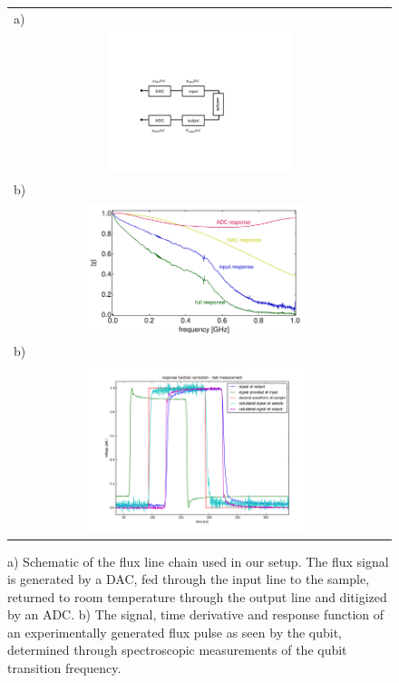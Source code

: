 \begin{figure}
	\begin{tabular}{c}
	 \multicolumn{1}{l}{a)} \\ \includegraphics[width=0.5\textwidth]{"./material/figures/measurement/fluxline_model"} \\
	 \multicolumn{1}{l}{b)} \\ \includegraphics[width=0.6\textwidth]{"./material_thesis/fluxline response/response"} \\
	 \multicolumn{1}{l}{b)} \\ \includegraphics[width=0.6\textwidth]{"./data/ct5/2010_06_15 - fluxline response/test_measurement"}
	 \end{tabular}
	 \caption[]{a) Schematic of the flux line chain used in our setup. The flux signal is generated by a DAC, fed through the input line to the sample, returned to room temperature through the output line and ditigized by an ADC. b) The signal, time derivative and response function of an experimentally generated flux pulse as seen by the qubit, determined through spectroscopic measurements of the qubit transition frequency.}
	 \label{fig:FluxLineResponseFunction}
\end{figure}

